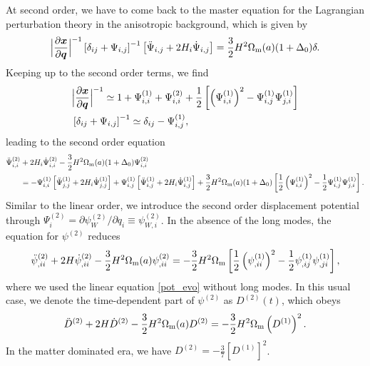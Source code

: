 \documentclass[a4paper,11pt]{article}
\newcommand{\vx}{{\bm x}}
\newcommand{\vq}{{\bm q}}
\begin{document}
At second order, we have to come back to the master equation for the Lagrangian perturbation theory
in the anisotropic background, which is given by
\begin{align}
    \Bigl| \frac{\partial\vx}{\partial\vq} \Bigr|^{-1}
    \left[ \delta_{ij} + \Psi_{i,j} \right]^{-1}
    \left[ \ddot{\Psi}_{i,j} + 2H_i\dot{\Psi}_{i,j} \right]
    =\frac32 H^2\Omega_{\rm m}(a)(1+\Delta_0)\delta.
\end{align}
Keeping up to the second order terms, we find
\begin{align}
&\Bigl| \frac{\partial\vx}{\partial\vq} \Bigr|^{-1}  \simeq
    1 + \Psi_{i,i}^{(1)} + \Psi_{i,i}^{(2)} + \frac12 \left[\left(\Psi_{i,i}^{(1)} \right)^2 - \Psi_{i,j}^{(1)}\Psi_{j,i}^{(1)} \right]
    \\
&\left[ \delta_{ij} + \Psi_{i,j} \right]^{-1} \simeq \delta_{ij} - \Psi_{i,j}^{(1)},
\end{align}
leading to the second order equation
\begin{align}
\ddot \Psi^{(2)}_{i,i} &+ 2H_i\dot \Psi^{(2)}_{i,i} -\frac32 H^2\Omega_{\rm m}(a)(1+\Delta_0)\Psi_{i,i}^{(2)}
    \nonumber\\
    &= -\Psi_{i,i}^{(1)}\left[\ddot \Psi^{(1)}_{j,j} + 2H_i\dot \Psi_{j,j}^{(1)} \right]
    + \Psi_{i,j}^{(1)}\left[\ddot \Psi^{(1)}_{i,j} + 2H_i\dot \Psi_{i,j}^{(1)} \right]
    + \frac32 H^2 \Omega_{\rm m}(a) (1+\Delta_0)
    \left[\frac12\left(\Psi_{i,i}^{(1)}\right)^2 - \frac12\Psi_{i,j}^{(1)}\Psi_{j,i}^{(1)}  \right].
\end{align}
Similar to the linear order, we introduce the second order displacement potential
through $\Psi_i^{(2)} = \partial\psi_W^{(2)}/\partial q_i \equiv \psi^{(2)}_{W,i}$.
In the absence of the long modes, the equation for $\psi^{(2)}$ reduces
\begin{align}
\ddot \psi^{(2)}_{,ii} + 2H\dot \psi^{(2)}_{,ii}-\frac32 H^2 \Omega_{\rm m}(a)\psi^{(2)}_{,ii}
 = -\frac32 H^2 \Omega_{\rm m}\left[\frac12 \left( \psi^{(1)}_{,ii} \right)^2 -\frac12 \psi^{(1)}_{,ij}\psi^{(1)}_{,ji} \right],
\end{align}
where we used the linear equation \eqref{pot_evo} without long modes.
In this usual case, we denote the time-dependent part of $\psi^{(2)}$ as $D^{(2)}(t)$, which obeys
\begin{align}
\ddot D^{(2)} + 2H \dot D^{(2)} - \frac32 H^2 \Omega_{\rm m}(a) D^{(2)} = -\frac32 H^2 \Omega_{\rm m}\left( D^{(1)} \right)^2.
\end{align}
In the matter dominated era, we have $D^{(2)}= -\frac37 \left[D^{(1)}\right]^2$.
\end{document}
